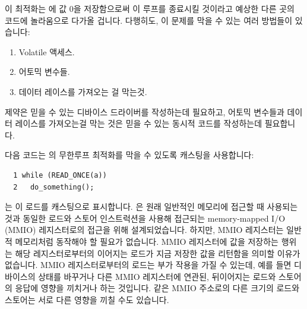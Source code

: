 이 최적화는  에 값 0을 저장함으로써 이 루프를 종료시킬 것이라고 예상한
다른 곳의 코드에 놀라움으로 다가올 겁니다.
다행히도, 이 문제를 막을 수 있는 여러 방법들이 있습니다:

\begin{enumerate}
\item	Volatile 액세스.
\item	어토믹 변수들.
\item	데이터 레이스를 가져오는 걸 막는것.

\end{enumerate}

 제약은 믿을 수 있는 디바이스 드라이버를 작성하는데 필요하고,
어토믹 변수들과 데이터 레이스를 가져오는걸 막는 것은 믿을 수 있는 동시적 코드를
작성하는데 필요합니다.

다음 코드는  의 무한루프 최적화를 막을 수 있도록 
캐스팅을 사용합니다:

\vspace{5pt}
\begin{minipage}[t]{\columnwidth}
\scriptsize
\begin{verbatim}
  1 while (READ_ONCE(a))
  2   do_something();
\end{verbatim}
\end{minipage}
\vspace{5pt}

 는 이 로드를  캐스팅으로 표시합니다.
 은 원래 일반적인 메모리에 접근할 때 사용되는 것과 동일한 로드와
스토어 인스트럭션을 사용해 접근되는 memory-mapped I/O (MMIO) 레지스터로의
접근을 위해 설계되었습니다.
하지만, MMIO 레지스터는 일반적 메모리처럼 동작해야 할 필요가 없습니다.
MMIO 레지스터에 값을 저장하는 행위는 해당 레지스터로부터의 이어지는 로드가 지금
저장한 값을 리턴함을 의미할 이유가 없습니다.
MMIO 레지스터로부터의 로드는 부가 작용을 가질 수 있는데, 예를 들면 디바이스의
상태를 바꾸거나 다른 MMIO 레지스터에 연관된, 뒤이어지는 로드와 스토어의 응답에
영향을 끼치거나 하는 것입니다.
같은 MMIO 주소로의 다른 크기의 로드와 스토어는 서로 다른 영향을 끼칠 수도
있습니다.
\iffalse

